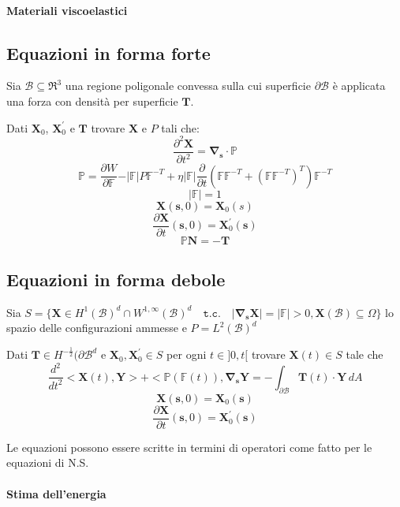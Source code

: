 \documentclass{book}
\newcommand{\Nabla}{\boldsymbol{\nabla}}
\begin{document}
\paragraph{Materiali viscoelastici}

\subsection{Equazioni in forma forte}

Sia $\mathcal{B} \subseteq \Re^3$ una regione poligonale convessa sulla cui superficie $\partial\mathcal{B}$ è applicata una forza con densità per superficie $\mathbf{T}$.

Dati $\mathbf{X}_0$, $\mathbf{X}^{'}_0$ e $\mathbf{T}$ trovare $\mathbf{X}$ e $P$ tali che:
$$\frac{\partial^2\mathbf{X}}{\partial t^2} = \Nabla_\mathbf{s} \cdot \mathbb{P}$$
$$\mathbb{P} = \frac{\partial W}{\partial\mathbb{F}} - \vert\mathbb{F}\vert P\mathbb{F}^{-T} + \eta\vert\mathbb{F}\vert \frac{\partial}{\partial t}(\mathbb{F}\mathbb{F}^{-T} + (\mathbb{F}\mathbb{F}^{-T})^T)\mathbb{F}^{-T}$$
$$\vert\mathbb{F}\vert=1$$
$$\mathbf{X}(\mathbf{s},0)=\mathbf{X}_0(s)$$
$$\frac{\partial \mathbf{X}}{\partial t}(\mathbf{s},0)=\mathbf{X}^{'}_0(\mathbf{s})$$
$$\mathbb{P}\mathbf{N}=-\mathbf{T}$$

\subsection{Equazioni in forma debole}

Sia $S = \{ \mathbf{X} \in H^1(\mathcal{B})^d \cap W^{1,\infty}(\mathcal{B})^d \quad \texttt{t.c.} \quad \vert \boldsymbol {\nabla}_{\mathbf{s}}\mathbf{X}\vert = \vert \mathbb{F} \vert > 0, \mathbf{X}(\mathcal{B}) \subseteq \Omega \}$ lo spazio delle configurazioni ammesse e $P = L^2(\mathcal{B})^d$

Dati $\mathbf{T} \in H^{-\frac{1}{2}}(\partial\mathcal{B}^d$ e $\mathbf{X}_0,\mathbf{X}^{'}_0 \in S$ per ogni $t \in ]0,t[$ trovare $\mathbf{X}(t) \in S$ tale che 
$$\frac{d^2}{dt^2} < \mathbf{X}(t), \mathbf{Y} > + < \mathbb{P}(\mathbb{F}(t)), \Nabla_\mathbf{s} \mathbf{Y} = -\int_{\partial\mathcal{B}}\mathbf{T}(t)\cdot\mathbf{Y}\,dA$$
$$\mathbf{X}(\mathbf{s},0)=\mathbf{X}_0(\mathbf{s})$$
$$\frac{\partial\mathbf{X}}{\partial t}(\mathbf{s},0)=\mathbf{X}^{'}_0(\mathbf{s})$$

Le equazioni possono essere scritte in termini di operatori come fatto per le equazioni di N.S.

\paragraph{Stima dell'energia}
\end{document}
